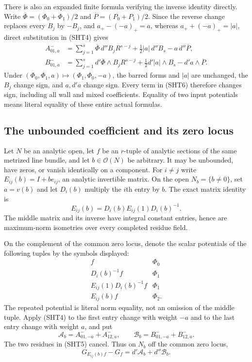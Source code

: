 There is also an expanded finite formula verifying
the inverse identity directly.  Write
$\overline\Phi=(\Phi_0+\Phi_1)/2$ and
$\overline P=(P_0+P_1)/2$.  Since the reverse change
replaces every $B_j$ by $-B_j$, and
$a_+-(-a)_+=a$, whereas $a_++(-a)_+=|a|$, direct
substitution in (SHT4) gives
\[
 \begin{split}
 A^-_{01,a}&=\sum_{j=1}^s\overline\Phi\,d''B_jR^{s-j}
                         +\tfrac12|a|\,d''B_s-a\,d''\overline P,\\
 B^-_{01,a}&=\sum_{j=1}^sd'\overline\Phi\wedge B_jR^{s-j}
                         +\tfrac12d'|a|\wedge B_s-d'a\wedge\overline P.
 \end{split}
 \tag{SHT6}
\]
Under $(\Phi_0,\Phi_1,a)\mapsto(\Phi_1,\Phi_0,-a)$,
the barred forms and $|a|$ are unchanged, the $B_j$
change sign, and $a,d'a$ change sign.  Every term in
(SHT6) therefore changes sign, including all wall and
mixed coefficients.  Equality of two input potentials
means literal equality of these entire actual formulas.

\subsection{The unbounded coefficient and its zero locus}

Let $N$ be an analytic open, let $f$ be an $r$-tuple
of analytic sections of the same metrized line bundle,
and let $b\in\mathcal O(N)$ be arbitrary.  It may
be unbounded, have zeros, or vanish identically on a
component.  For $i\ne j$ write
$E_{ij}(b)=I+b e_{ij}$, an analytic invertible matrix.
On the open $N_b=\{b\ne0\}$, set $a=v(b)$ and let
$D_i(b)$ multiply the $i$th entry by $b$.  The exact
matrix identity is
\[
                E_{ij}(b)=D_i(b)E_{ij}(1)D_i(b)^{-1}.
 \tag{SHT7}
\]
The middle matrix and its inverse have integral
constant entries, hence are maximum-norm isometries
over every completed residue field.

On the complement of the common zero locus, denote
the scalar potentials of the following tuples by
the symbols displayed:
\[
 \begin{array}{c|c}
 f&\Phi_0\\
 D_i(b)^{-1}f&\Phi_1\\
 E_{ij}(1)D_i(b)^{-1}f&\Phi_1\\
 E_{ij}(b)f&\Phi_2.
 \end{array}
 \tag{SHT8}
\]
The repeated potential is literal norm equality,
not an omission of the middle tuple.  Apply (SHT4)
to the first entry change with weight $-a$ and
to the last entry change with weight $a$, and put
\[
 \mathcal A_b=A^-_{01,-a}+A^-_{12,a},
                \qquad
 \mathcal B_b=B^-_{01,-a}+B^-_{12,a}.
 \tag{SHT9}
\]
The two residues in (SHT5) cancel.  Thus on $N_b$
off the common zero locus,
\[
                 G_{E_{ij}(b)f}-G_f
                                =d'\mathcal A_b+d''\mathcal B_b.
 \tag{SHT10}
\]

